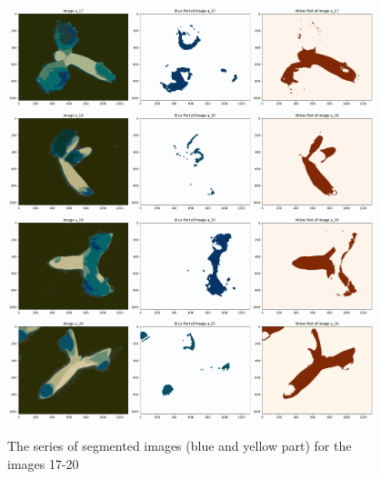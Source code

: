 \documentclass{article}
\begin{document}
\begin{figure}[h!]
\centering
\includegraphics[width=0.95\textwidth]{Report/Images/Appendix Images/ColorSegments/Image17.png}
\includegraphics[width=0.95\textwidth]{Report/Images/Appendix Images/ColorSegments/Image18.png}
\includegraphics[width=0.95\textwidth]{Report/Images/Appendix Images/ColorSegments/Image19.png}
\includegraphics[width=0.95\textwidth]{Report/Images/Appendix Images/ColorSegments/Image20.png}
\caption{The series of segmented images (blue and yellow part) for the images 17-20} 
\label{fig:segment17-20}
\end{figure}
\end{document}
